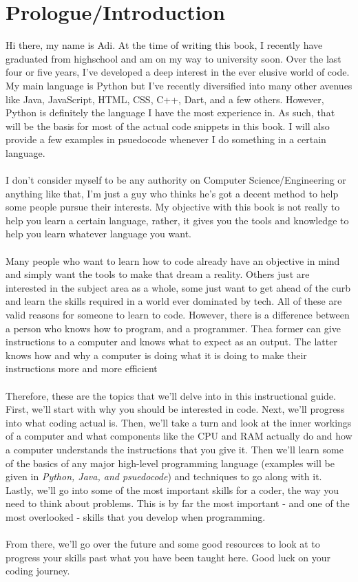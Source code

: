 \documentclass[12pt,a4paper]{book}
\begin{document}
	\chapter*{Prologue/Introduction}  \label{chap:intro}
		Hi there, my name is Adi. At the time of writing this book, I recently have graduated from highschool and am on my way to university soon. Over the last four or five years, I've developed a deep interest in the ever elusive world of code. My main language is Python but I've recently diversified into many other avenues like Java, JavaScript, HTML, CSS, C++, Dart, and a few others. However, Python is definitely the language I have the most experience in. As such, that will be the basis for most of the actual code snippets in this book. I will also provide a few examples in psuedocode whenever I do something in a certain language. 
		\\\\
		I don't consider myself to be any authority on Computer Science/Engineering or anything like that, I'm just a guy who thinks he's got a decent method to help some people pursue their interests. My objective with this book is not really to help you learn a certain language, rather, it gives you the tools and knowledge to help you learn whatever language you want.
		\\\\
		Many people who want to learn how to code already have an objective in mind and simply want the tools to make that dream a reality. Others just are interested in the subject area as a whole, some just want to get ahead of the curb and learn the skills required in a world ever dominated by tech. All of these are valid reasons for someone to learn to code. However, there is a difference between a person who knows how to program, and a programmer. Thea former can give instructions to a computer and knows what to expect as an output. The latter knows how and why a computer is doing what it is doing to make their instructions more and more efficient
		\\\\
		Therefore, these are the topics that we'll delve into in this instructional guide. First, we'll start with why you should be interested in code. Next, we'll progress into what coding actual is. Then, we'll take a turn and look at the inner workings of a computer and what components like the CPU and RAM actually do and how a computer understands the instructions that you give it. Then we'll learn some of the basics of any major high-level programming language (examples will be given in \textit{Python, Java, and psuedocode}) and techniques to go along with it. Lastly, we'll go into some of the most important skills for a coder, the way you need to think about problems. This is by far the most important - and one of the most overlooked - skills that you develop when programming.
		\\\\
		From there, we'll go over the future and some good resources to look at to progress your skills past what you have been taught here. Good luck on your coding journey.
\end{document}
